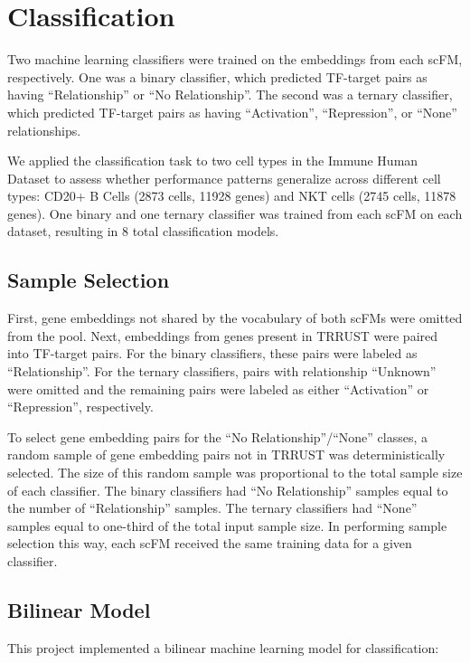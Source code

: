 \documentclass[12pt, letterpaper]{report}
\let\oldsection\section
\renewcommand{\section}{\clearpage\oldsection}
\begin{document}
\section{Classification}

Two machine learning classifiers were trained on the embeddings from each scFM, respectively. One was a binary classifier, which predicted TF-target pairs as having ``Relationship'' or ``No Relationship''. The second was a ternary classifier, which predicted TF-target pairs as having ``Activation'', ``Repression'', or ``None'' relationships.

We applied the classification task to two cell types in the Immune Human Dataset to assess whether performance patterns generalize across different cell types: CD20+ B Cells (2873 cells, 11928 genes) and NKT cells (2745 cells, 11878 genes). One binary and one ternary classifier was trained from each scFM on each dataset, resulting in 8 total classification models.

\subsection{Sample Selection}

First, gene embeddings not shared by the vocabulary of both scFMs were omitted from the pool. Next, embeddings from genes present in TRRUST were paired into TF-target pairs. For the binary classifiers, these pairs were labeled as ``Relationship''. For the ternary classifiers, pairs with relationship ``Unknown'' were omitted and the remaining pairs were labeled as either ``Activation'' or ``Repression'', respectively.

To select gene embedding pairs for the ``No Relationship''/``None'' classes, a random sample of gene embedding pairs not in TRRUST was deterministically selected. The size of this random sample was proportional to the total sample size of each classifier. The binary classifiers had ``No Relationship'' samples equal to the number of ``Relationship'' samples. The ternary classifiers had ``None'' samples equal to one-third of the total input sample size. In performing sample selection this way, each scFM received the same training data for a given classifier.

\subsection{Bilinear Model}

This project implemented a bilinear machine learning model for classification:
\end{document}
